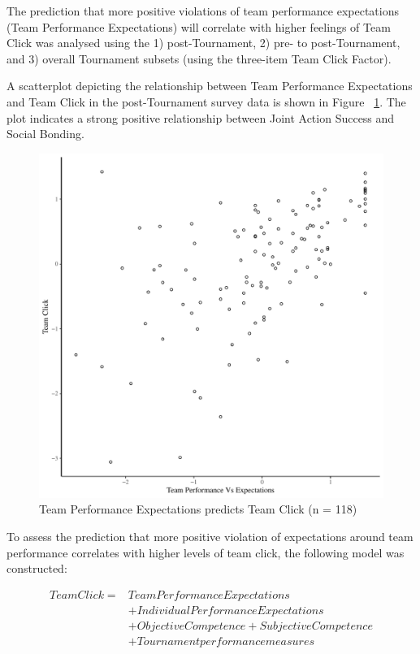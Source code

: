 \begin{landscape}
The prediction that more positive violations of team performance expectations (Team Performance Expectations) will correlate with higher feelings of Team Click was analysed using the 1) post-Tournament, 2) pre- to post-Tournament, and 3) overall Tournament subsets (using the three-item Team Click Factor).

A scatterplot depicting the relationship between Team Performance Expectations and Team Click in the post-Tournament survey data is shown in Figure ~\ref{fig:teamPerfClickBasicXY}. The plot indicates a strong positive relationship between Joint Action Success and Social Bonding.

\begin{figure}[htbp]
\includegraphics[width = \linewidth]{images/teamPerfClickBasicXY.pdf}
  \caption{Team Performance Expectations predicts Team Click (n = 118)}
  \label{fig:teamPerfClickBasicXY}
\end{figure}

To assess the prediction that more positive violation of expectations around team performance correlates with higher levels of team click, the following model was constructed:

  \begin{equation}
    \begin{align*}
      Team Click =  & Team Performance Expectations \\
                &+ Individual Performance Expectations \\
                &+ Objective Competence + Subjective Competence \\
                &+ Tournament performance measures \\
    \end{align*}
  \end{equation}


\end{landscape}
